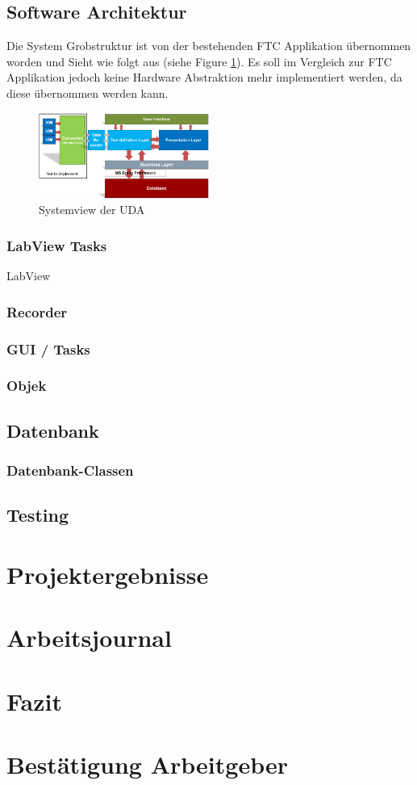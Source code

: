 \documentclass[10pt]{scrartcl}
\begin{document}
\subsection{Software Architektur}
Die System Grobstruktur ist von der bestehenden FTC Applikation übernommen worden und Sieht wie folgt aus (siehe Figure \ref{fig:SystemViewUDA}). Es soll im Vergleich zur FTC Applikation jedoch keine Hardware Abstraktion mehr implementiert werden, da diese übernommen werden kann.
\begin{figure}[htbp] 
	\centering
	\includegraphics[width=0.5\textwidth]{Systemview}
	\caption{Systemview der UDA}
	\label{fig:SystemViewUDA}
\end{figure}
\subsubsection{LabView Tasks}
LabView
\subsubsection{Recorder}
\subsubsection{GUI / Tasks}
\subsubsection{Objek}
\subsection{Datenbank}
\subsubsection{Datenbank-Classen}
\subsection{Testing}
\section{Projektergebnisse}
\section{Arbeitsjournal}
\section{Fazit}
\section{Bestätigung Arbeitgeber}
{}

\end{document}

